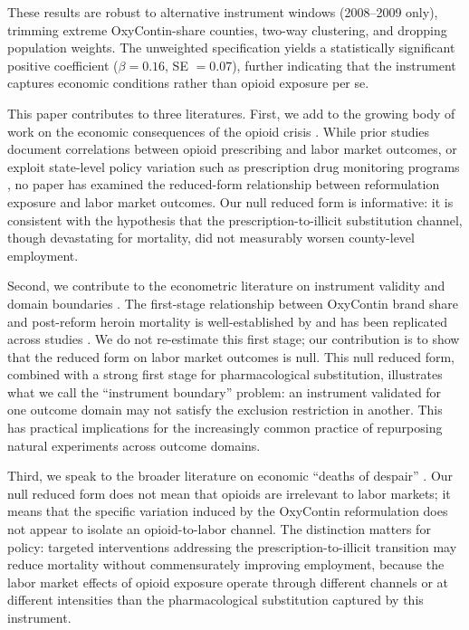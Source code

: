\documentclass[12pt]{article}
\begin{document}
These results are robust to alternative instrument windows (2008--2009 only), trimming extreme OxyContin-share counties, two-way clustering, and dropping population weights. The unweighted specification yields a statistically significant positive coefficient ($\beta = 0.16$, SE $= 0.07$), further indicating that the instrument captures economic conditions rather than opioid exposure per se.

This paper contributes to three literatures. First, we add to the growing body of work on the economic consequences of the opioid crisis \citep{powell2020, park2020, ouimet2020, doleac2019}. While prior studies document correlations between opioid prescribing and labor market outcomes, or exploit state-level policy variation such as prescription drug monitoring programs \citep{buchmueller2018, kaestner2019}, no paper has examined the reduced-form relationship between reformulation exposure and labor market outcomes. Our null reduced form is informative: it is consistent with the hypothesis that the prescription-to-illicit substitution channel, though devastating for mortality, did not measurably worsen county-level employment.

Second, we contribute to the econometric literature on instrument validity and domain boundaries \citep{angrist1996, imbens2014, andrews2019}. The first-stage relationship between OxyContin brand share and post-reform heroin mortality is well-established by \citet{alpert2018} and has been replicated across studies \citep{evans2019, powell2020}. We do not re-estimate this first stage; our contribution is to show that the reduced form on labor market outcomes is null. This null reduced form, combined with a strong first stage for pharmacological substitution, illustrates what we call the ``instrument boundary'' problem: an instrument validated for one outcome domain may not satisfy the exclusion restriction in another. This has practical implications for the increasingly common practice of repurposing natural experiments across outcome domains.

Third, we speak to the broader literature on economic ``deaths of despair'' \citep{case2015, case2017, ruhm2019, pierce2020}. Our null reduced form does not mean that opioids are irrelevant to labor markets; it means that the specific variation induced by the OxyContin reformulation does not appear to isolate an opioid-to-labor channel. The distinction matters for policy: targeted interventions addressing the prescription-to-illicit transition may reduce mortality without commensurately improving employment, because the labor market effects of opioid exposure operate through different channels or at different intensities than the pharmacological substitution captured by this instrument.
\end{document}

